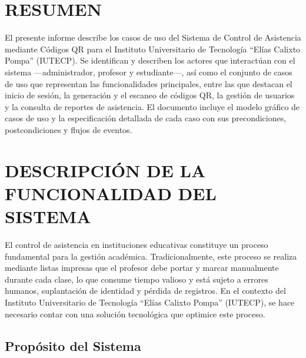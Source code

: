 \documentclass[12pt, letterpaper, oneside]{report}
\begin{document}
\tableofcontents
\newpage

\chapter*{RESUMEN}

El presente informe describe los casos de uso del Sistema de Control de Asistencia mediante C\'odigos QR para el Instituto Universitario de Tecnolog\'ia ``El\'ias Calixto Pompa'' (IUTECP). Se identifican y describen los actores que interact\'uan con el sistema ---administrador, profesor y estudiante---, as\'i como el conjunto de casos de uso que representan las funcionalidades principales, entre las que destacan el inicio de sesi\'on, la generaci\'on y el escaneo de c\'odigos QR, la gesti\'on de usuarios y la consulta de reportes de asistencia. El documento incluye el modelo gr\'afico de casos de uso y la especificaci\'on detallada de cada caso con sus precondiciones, postcondiciones y flujos de eventos.

\newpage

\pagestyle{body}

\chapter{DESCRIPCI\'ON DE LA FUNCIONALIDAD DEL SISTEMA}

El control de asistencia en instituciones educativas constituye un proceso fundamental para la gesti\'on acad\'emica. Tradicionalmente, este proceso se realiza mediante listas impresas que el profesor debe portar y marcar manualmente durante cada clase, lo que consume tiempo valioso y est\'a sujeto a errores humanos, suplantaci\'on de identidad y p\'erdida de registros. En el contexto del Instituto Universitario de Tecnolog\'ia ``El\'ias Calixto Pompa'' (IUTECP), se hace necesario contar con una soluci\'on tecnol\'ogica que optimice este proceso.

\section{Prop\'osito del Sistema}
\end{document}
